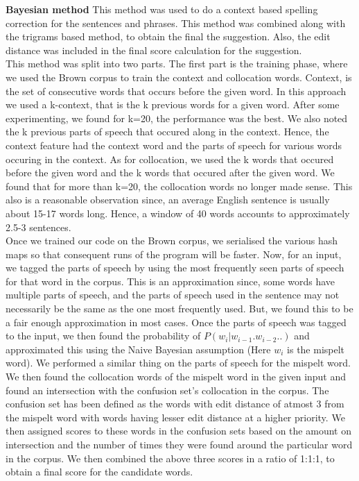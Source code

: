 \documentclass[a4paper,10pt]{article}
\title{}
\author{}
\date{}
\begin{document}
\maketitle

\textbf{Bayesian method}
  This method was used to do a context based spelling correction for the sentences and phrases. This method was combined along with the trigrams based 
  method, to obtain the final the suggestion. Also, the edit distance was included in the final score calculation for the suggestion.\\
  
  This method was split into two parts. The first part is the training phase, where we used the Brown corpus to train the context and collocation words.
  Context, is the set of consecutive words that occurs before the given word. In this approach we used a k-context, that is the k previous words for
  a given word. After some experimenting, we found for k=20, the performance was the best. We also noted the k previous parts of speech that occured
  along in the context. Hence, the context feature had the context word and the parts of speech for various words occuring in the context. As for collocation,
  we used the k words that occured before the given word and the k words that occured after the given word. We found that for more than k=20, the collocation
  words no longer made sense. This also is a reasonable observation since, an average English sentence is usually about 15-17 words long. Hence, a window
  of 40 words accounts to approximately 2.5-3 sentences. \\
  
  Once we trained our code on the Brown corpus, we serialised the various hash maps so that consequent runs of the program will be faster. Now, for an
  input, we tagged the parts of speech by using the most frequently seen parts of speech for that word in the corpus. This is an approximation since, some
  words have multiple parts of speech, and the parts of speech used in the sentence may not necessarily be the same as the one most frequently used.
  But, we found this to be a fair enough approximation in most cases. Once the parts of speech was tagged to the input, we then found the probability
  of $P(w_i | w_{i-1} . w_{i-2} ..)$ and approximated this using the Naive Bayesian assumption (Here $w_{i}$ is the mispelt word). We performed a similar thing on the parts of speech for 
  the mispelt word. We then found the collocation words of the mispelt word in the given input and found an intersection with the confusion set's collocation in
  the corpus. The confusion set has been defined as the words with edit distance of atmost 3 from the mispelt word with words having lesser edit distance
  at a higher priority. We then assigned scores to these words in the confusion sets based on the amount on intersection and the number of times they were
  found around the particular word in the corpus. We then combined the above three scores in a ratio of 1:1:1, to obtain a final score for the candidate
  words.  \\
  
\end{document}
